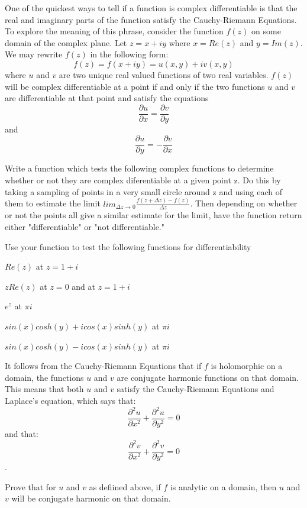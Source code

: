 One of the quickest ways to tell if a function is complex differentiable is that the real and imaginary parts of the function satisfy the Cauchy-Riemann Equations. To explore the meaning of this phrase, consider the function $f(z)$ on some domain of the complex plane. Let $z=x+i y$ where $x=Re(z)$ and $y=Im(z)$. We may rewrite $f(z)$ in the following form: $$f(z)=f(x+i y)=u(x,y)+i v(x,y)$$ where $u$ and $v$ are two unique real valued functions of two real variables. $f(z)$ will be complex differentiable at a point if and only if the two functions $u$ and $v$ are differentiable at that point and satisfy the equations $$\frac{\partial u}{\partial x}=\frac{\partial v}{\partial y}$$ and $$\frac{\partial u}{\partial y}=-\frac{\partial v}{\partial x}$$

\begin{problem}
Write a function which tests the following complex functions to determine whether or not they are complex diferentiable at a given point z. Do this by taking a sampling of points in a very small circle around z and using each of them to estimate the limit $lim_{\Delta z \to 0} \frac{f(z+\Delta z)-f(z)}{\Delta z}$. Then depending on whether or not the points all give a similar estimate for the limit, have the function return either "differentiable" or "not differentiable." 

Use your function to test the following functions for differentiability

$Re(z)$ at $z=1+ i$

$z Re(z)$ at $z=0$ and at $z=1+ i$

$e^z$ at $\pi i$

$sin(x) cosh(y) + i cos(x) sinh(y)$ at $\pi i$

$sin(x) cosh(y) - i cos(x) sinh(y)$ at $\pi i$
\end{problem}

It follows from the Cauchy-Riemann Equations that if $f$ is holomorphic on a domain, the functions $u$ and $v$ are conjugate harmonic functions on that domain. This means that both $u$ and $v$ satisfy the Cauchy-Riemann Equations and Laplace's equation, which says that: $$\frac{\partial^2 u}{\partial x^2}+\frac{\partial^2 u}{\partial y^2}=0$$ and that: $$\frac{\partial^2 v}{\partial x^2}+\frac{\partial^2 v}{\partial y^2}=0$$. 

\begin{problem}
Prove that for $u$ and $v$ as defiined above, if $f$ is analytic on a domain, then $u$ and $v$ will be conjugate harmonic on that domain.
\end{problem}

